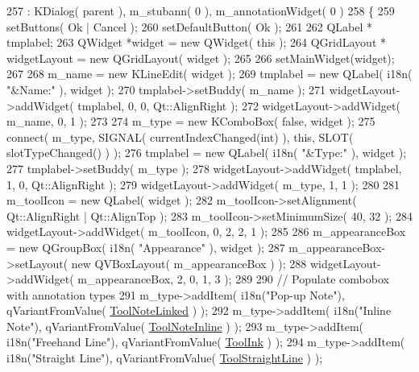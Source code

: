 \begin{DoxyCode}
257     : KDialog( parent ), m\_stubann( 0 ), m\_annotationWidget( 0 )
258 \{
259     setButtons( Ok | Cancel );
260     setDefaultButton( Ok );
261 
262     QLabel * tmplabel;
263     QWidget *widget = \textcolor{keyword}{new} QWidget( \textcolor{keyword}{this} );
264     QGridLayout * widgetLayout = \textcolor{keyword}{new} QGridLayout( widget );
265 
266     setMainWidget(widget);
267 
268     m\_name = \textcolor{keyword}{new} KLineEdit( widget );
269     tmplabel = \textcolor{keyword}{new} QLabel( i18n( \textcolor{stringliteral}{"&Name:"} ), widget );
270     tmplabel->setBuddy( m\_name );
271     widgetLayout->addWidget( tmplabel, 0, 0, Qt::AlignRight );
272     widgetLayout->addWidget( m\_name, 0, 1 );
273 
274     m\_type = \textcolor{keyword}{new} KComboBox( \textcolor{keyword}{false}, widget );
275     connect( m\_type, SIGNAL( currentIndexChanged(\textcolor{keywordtype}{int}) ), \textcolor{keyword}{this}, SLOT( slotTypeChanged() ) );
276     tmplabel = \textcolor{keyword}{new} QLabel( i18n( \textcolor{stringliteral}{"&Type:"} ), widget );
277     tmplabel->setBuddy( m\_type );
278     widgetLayout->addWidget( tmplabel, 1, 0, Qt::AlignRight );
279     widgetLayout->addWidget( m\_type, 1, 1 );
280 
281     m\_toolIcon = \textcolor{keyword}{new} QLabel( widget );
282     m\_toolIcon->setAlignment( Qt::AlignRight | Qt::AlignTop );
283     m\_toolIcon->setMinimumSize( 40, 32 );
284     widgetLayout->addWidget( m\_toolIcon, 0, 2, 2, 1 );
285 
286     m\_appearanceBox = \textcolor{keyword}{new} QGroupBox( i18n( \textcolor{stringliteral}{"Appearance"} ), widget );
287     m\_appearanceBox->setLayout( \textcolor{keyword}{new} QVBoxLayout( m\_appearanceBox ) );
288     widgetLayout->addWidget( m\_appearanceBox, 2, 0, 1, 3 );
289 
290     \textcolor{comment}{// Populate combobox with annotation types}
291     m\_type->addItem( i18n(\textcolor{stringliteral}{"Pop-up Note"}), qVariantFromValue( \hyperlink{classEditAnnotToolDialog_ae4572c0cf4fc351cf03e4d86ef595a9ca87068985a2e61ea99764542268551c13}{ToolNoteLinked} ) );
292     m\_type->addItem( i18n(\textcolor{stringliteral}{"Inline Note"}), qVariantFromValue( \hyperlink{classEditAnnotToolDialog_ae4572c0cf4fc351cf03e4d86ef595a9ca198ea29d3ebd27d859c47c7d7e0499e2}{ToolNoteInline} ) );
293     m\_type->addItem( i18n(\textcolor{stringliteral}{"Freehand Line"}), qVariantFromValue( \hyperlink{classEditAnnotToolDialog_ae4572c0cf4fc351cf03e4d86ef595a9caef2e195c93ecc9f1d6bd1dae0deb5c19}{ToolInk} ) );
294     m\_type->addItem( i18n(\textcolor{stringliteral}{"Straight Line"}), qVariantFromValue( \hyperlink{classEditAnnotToolDialog_ae4572c0cf4fc351cf03e4d86ef595a9ca28043180b87b79e0defc7b99eddb6c0d}{ToolStraightLine} ) );

\end{DoxyCode}
